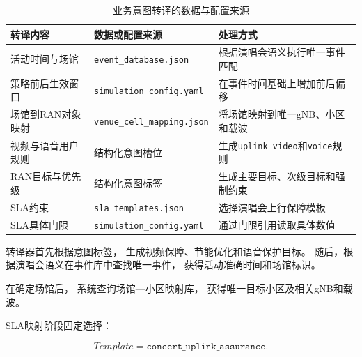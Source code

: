 \documentclass[lang=cn,12pt]{elegantbook}
\begin{document}
\begin{table}[H]
    \centering
    \caption{业务意图转译的数据与配置来源}
    \label{tab:translation_data_source_reduced}
    \small
    \renewcommand{\arraystretch}{1.25}
    \begin{tabularx}{\textwidth}{
        >{\raggedright\arraybackslash}p{}
        >{\raggedright\arraybackslash}p{}
        >{\raggedright\arraybackslash}X
    }
        \toprule
        转译内容 & 数据或配置来源 & 处理方式 \\
        \midrule

        活动时间与场馆
        & \texttt{event\_database.json}
        & 根据演唱会语义执行唯一事件匹配
        \\

        策略前后生效窗口
        & \texttt{simulation\_config.yaml}
        & 在事件时间基础上增加前后偏移
        \\

        场馆到RAN对象映射
        & \texttt{venue\_cell\_mapping.json}
        & 将场馆映射到唯一gNB、小区和载波
        \\

        视频与语音用户规则
        & 结构化意图槽位
        & 生成\texttt{uplink\_video}和\texttt{voice}规则
        \\

        RAN目标与优先级
        & 结构化意图标签
        & 生成主要目标、次级目标和强制约束
        \\

        SLA约束
        & \texttt{sla\_templates.json}
        & 选择演唱会上行保障模板
        \\

        SLA具体门限
        & \texttt{simulation\_config.yaml}
        & 通过门限引用读取具体数值
        \\

        \bottomrule
    \end{tabularx}
\end{table}

转译器首先根据意图标签，
生成视频保障、节能优化和语音保护目标。
随后，根据演唱会语义在事件库中查找唯一事件，
获得活动准确时间和场馆标识。

在确定场馆后，
系统查询场馆—小区映射库，
获得唯一目标小区及相关gNB和载波。

SLA映射阶段固定选择：

\begin{equation}
Template
=
\texttt{concert\_uplink\_assurance}.
\label{eq:concert_sla_template_reduced}
\end{equation}
\end{document}
